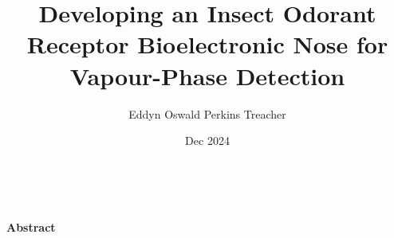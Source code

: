 \documentclass[
  a4paper,
]{scrbook}
\title{Developing an Insect Odorant Receptor Bioelectronic Nose for
Vapour-Phase Detection}
\author{Eddyn Oswald Perkins Treacher}
\date{Dec 2024}
\begin{document}
\frontmatter

\maketitle

\begin{spacing}{1.2}

\clearpage
\newpage
\thispagestyle{empty} %
\mbox{~}
\clearpage
\newpage


\thispagestyle{plain}

\begin{flushleft}
\huge\textbf{Abstract}
\end{flushleft}

\vspace*{\baselineskip}


\end{spacing}
\end{document}
